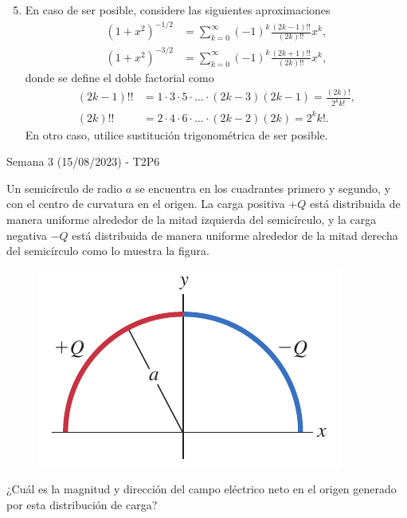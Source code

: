 \begin{frame}{}
    \begin{enumerate}
        \setcounter{enumi}{4}
        \item En caso de ser posible, considere las siguientes aproximaciones
        \begin{equation*}
        \begin{aligned}
            (1+x^2)^{-1/2}&=\sum_{k=0}^\infty (-1)^k\frac{(2k-1)!!}{(2k)!!}x^k,\\
            (1+x^2)^{-3/2}&=\sum_{k=0}^\infty (-1)^k\frac{(2k+1)!!}{(2k)!!}x^k,
        \end{aligned}
        \end{equation*}
        donde se define el doble factorial como 
        \begin{equation*}
            \begin{aligned}
            (2k-1)!!&=1\cdot3\cdot5\cdot\dots\cdot(2k-3)(2k-1)=\frac{(2k)!}{2^kk!},\\
            (2k)!!&=2\cdot4\cdot6\cdot\dots\cdot(2k-2)(2k)=2^kk!.
            \end{aligned}
        \end{equation*}
        En otro caso, utilice sustitución trigonométrica de ser posible.
    \end{enumerate}
\end{frame}

\begin{frame}{Semana 3 (15/08/2023) - T2P6}

Un semicírculo de radio $a$ se encuentra en los cuadrantes primero y segundo, y con el centro de curvatura en el origen. La carga positiva $+Q$ está distribuida de manera uniforme alrededor de la mitad izquierda del semicírculo, y la carga negativa $-Q$ está distribuida de manera uniforme
alrededor de la mitad derecha del semicírculo como lo muestra la figura.

\begin{figure}
    \centering
    \includegraphics[scale=0.3]{figures/t2p6.png}
\end{figure}

¿Cuál es la magnitud y dirección del campo eléctrico neto en el origen generado por esta distribución de carga?
    
\end{frame}

